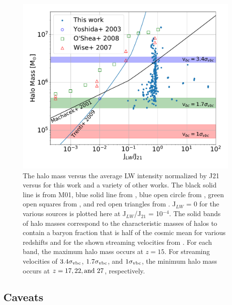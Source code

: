\documentclass[a4paper,fleqn,usenatbib]{mnras}
\begin{document}
\begin{figure}
	\includegraphics[width=\columnwidth]{images/compare_JLW_mass.pdf}
    \caption{The halo mass versus the average LW intensity normalized by J21 versus for this work and a variety of other works. The black solid line is from M01, blue solid line from \citet{Trenti09_SFR}, blue open circle from \citet{Yoshida03}, green open squares from \citet{OShea08}, and red open triangles from \citet{Wise07_UVB}. J$_{LW}$ = 0 for the various sources is plotted here at J$_{LW}$/J$_{21}$ = 10$^{-4}$. The solid bands of halo masses correspond to the characteristic masses of halos to contain a baryon fraction that is half of the cosmic mean for various redshifts and for the shown streaming velocities from \citet{Naoz13}. For each band, the maximum halo mass occurs at $z = 15$. For streaming velocities of $3.4 \sigma_{\rm vbc}$, $1.7 \sigma_{\rm vbc}$, and $1 \sigma_{\rm vbc}$, the minimum halo mass occurs at $z = 17, 22, \rm{and} \ 27$, respectively.}
    \label{fig:compare_JLW_mass}
\end{figure}

\subsection{Caveats}
\end{document}
